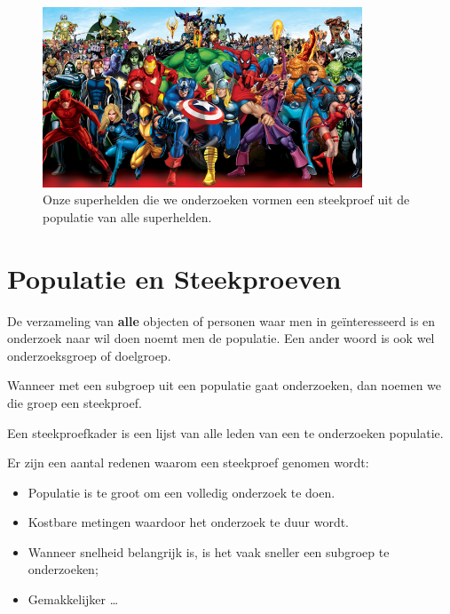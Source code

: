 \begin{figure}
  \centering
  \includegraphics[width=0.85\textwidth]{images/les5-heroes.jpg}
  \caption{Onze superhelden die we onderzoeken vormen een steekproef uit de populatie van alle superhelden.}
  \label{fig:populatieHelden}
\end{figure}

\section{Populatie en Steekproeven}
\begin{definition}[Populatie]
  De verzameling van \textbf{alle} objecten of personen waar men in ge\"interesseerd is en onderzoek naar wil doen noemt men de  populatie. Een ander woord is ook wel onderzoeksgroep of doelgroep.
\end{definition}

\begin{definition}[Steekproef]
  Wanneer met een subgroep uit een populatie gaat onderzoeken, dan noemen we die groep een  steekproef.
\end{definition}

\begin{definition}[Steekproefkader]
  Een  steekproefkader is een lijst van alle leden van een te onderzoeken populatie.
\end{definition}

Er zijn een aantal redenen waarom een steekproef genomen wordt:
\begin{itemize}
  \item Populatie is te groot om een volledig onderzoek te doen.
  \item Kostbare metingen waardoor het onderzoek te duur wordt.
  \item Wanneer snelheid belangrijk is, is het vaak sneller een subgroep te onderzoeken;
  \item Gemakkelijker \dots
\end{itemize}

